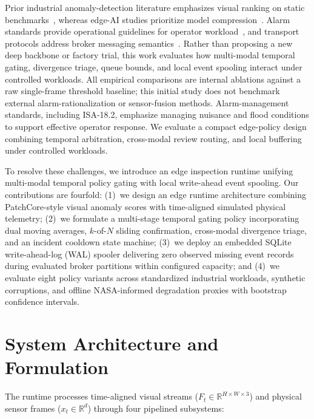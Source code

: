 \documentclass[conference]{IEEEtran}
\begin{document}
Prior industrial anomaly-detection literature emphasizes visual ranking on static benchmarks~\cite{roth2022patchcore,defard2021padim,bergmann2021mvtec}, whereas edge-AI studies prioritize model compression~\cite{chen2021edge}. Alarm standards provide operational guidelines for operator workload~\cite{isa182alarm}, and transport protocols address broker messaging semantics~\cite{mqttv5,sqlitewal}. Rather than proposing a new deep backbone or factory trial, this work evaluates how multi-modal temporal gating, divergence triage, queue bounds, and local event spooling interact under controlled workloads. All empirical comparisons are internal ablations against a raw single-frame threshold baseline; this initial study does not benchmark external alarm-rationalization or sensor-fusion methods. Alarm-management standards, including ISA-18.2, emphasize managing nuisance and flood conditions to support effective operator response. We evaluate a compact edge-policy design combining temporal arbitration, cross-modal review routing, and local buffering under controlled workloads.

To resolve these challenges, we introduce an edge inspection runtime unifying multi-modal temporal policy gating with local write-ahead event spooling. Our contributions are fourfold: (1)~we design an edge runtime architecture combining PatchCore-style visual anomaly scores with time-aligned simulated physical telemetry; (2)~we formulate a multi-stage temporal gating policy incorporating dual moving averages, $k$-of-$N$ sliding confirmation, cross-modal divergence triage, and an incident cooldown state machine; (3)~we deploy an embedded SQLite write-ahead-log (WAL) spooler delivering zero observed missing event records during evaluated broker partitions within configured capacity; and (4)~we evaluate eight policy variants across standardized industrial workloads, synthetic corruptions, and offline NASA-informed degradation proxies with bootstrap confidence intervals.

\section{System Architecture and Formulation}
The runtime processes time-aligned visual streams ($F_t \in \mathbb{R}^{H \times W \times 3}$) and physical sensor frames ($x_t \in \mathbb{R}^d$) through four pipelined subsystems:
\end{document}

